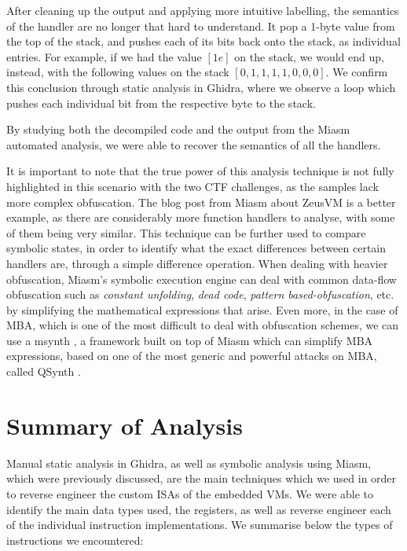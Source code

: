 After cleaning up the output and applying more intuitive labelling, the semantics of the handler are no longer that hard to understand. It pop a 1-byte value from the top of the stack, and pushes each of its bits back onto the stack, as individual entries. For example, if we had the value $[1e]$ on the stack, we would end up, instead, with the following values on the stack $[0, 1, 1, 1, 1, 0, 0, 0]$. We confirm this conclusion through static analysis in Ghidra, where we observe a loop which pushes each individual bit from the respective byte to the stack.

By studying both the decompiled code and the output from the Miasm automated analysis, we were able to recover the semantics of all the handlers. 

It is important to note that the true power of this analysis technique is not fully highlighted in this scenario with the two \gls{CTF} challenges, as the samples lack more complex obfuscation. The blog post from Miasm about ZeusVM \cite{zeusvm_miasm} is a better example, as there are considerably more function handlers to analyse, with some of them being very similar. This technique can be further used to compare symbolic states, in order to identify what the exact differences between certain handlers are, through a simple difference operation. When dealing with heavier obfuscation, Miasm's symbolic execution engine can deal with common data-flow obfuscation such as \emph{constant unfolding}, \emph{dead code}, \emph{pattern based-obfuscation}, etc. by simplifying the mathematical expressions that arise. Even more, in the case of \gls{MBA}, which is one of the most difficult to deal with obfuscation schemes, we can use a msynth \cite{msynth}, a framework built on top of Miasm which can simplify \gls{MBA} expressions, based on one of the most generic and powerful attacks on \gls{MBA}, called QSynth \cite{qsynth}.

\section{Summary of Analysis}

Manual static analysis in Ghidra, as well as symbolic analysis using Miasm, which were previously discussed, are the main techniques which we used in order to reverse engineer the custom \glspl{ISA} of the embedded \glspl{VM}. We were able to identify the main data types used, the registers, as well as reverse engineer each of the individual instruction implementations. We summarise below the types of instructions we encountered:

